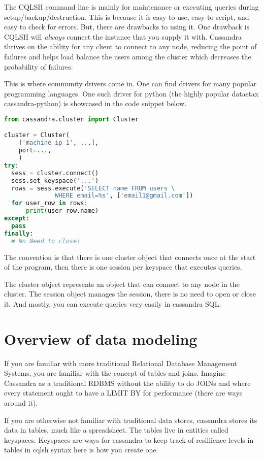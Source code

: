 \documentclass[9pt,twocolumn,twoside]{idsi}
\begin{document}
The CQLSH command line is mainly for maintenance or executing queries during setup/backup/destruction. This is because it is easy to use, easy to script, and easy to check for errors. But, there are drawbacks to using it. One drawback is CQLSH will \textit{always} connect the instance that you supply it with. Cassandra thrives on the ability for any client to connect to any node, reducing the point of failures and helps load balance the users among the cluster which decreases the probability of failures.

This is where community drivers come in. One can find drivers for many popular programming languages. One such driver for python (the highly popular datastax cassandra-python) is showcased in the code snippet below.

\begin{lstlisting}[language=Python]
from cassandra.cluster import Cluster

cluster = Cluster(
    ['machine_ip_1', ...],
    port=...,
    )
try:
  sess = cluster.connect()
  sess.set_keyspace('...')
  rows = sess.execute('SELECT name FROM users \
              WHERE email=%s', ['email1@gmail.com'])
  for user_row in rows:
      print(user_row.name)
except:
  pass
finally:
  # No Need to close!
\end{lstlisting}

The convention is that there is one cluster object that connects once at the start of the program, then there is one session per keyspace that executes queries.

The cluster object represents an object that can connect to any node in the cluster. The session object manages the session, there is no need to open or close it. And mostly, you can execute queries very easily in cassandra SQL.

\section{Overview of data modeling}

If you are familiar with more traditional Relational Database Management Systems, you are familiar with the concept of tables and joins. Imagine Cassandra as a traditional RDBMS without the ability to do JOINs and where every statement ought to have a LIMIT BY for performance (there are ways around it).

If you are otherwise not familiar with traditional data stores, cassandra stores its data in tables, much like a spreadsheet. The tables live in entities called keyspaces. Keyspaces are ways for cassandra to keep track of resillience levels in tables in cqlsh syntax here is how you create one.
\end{document}
